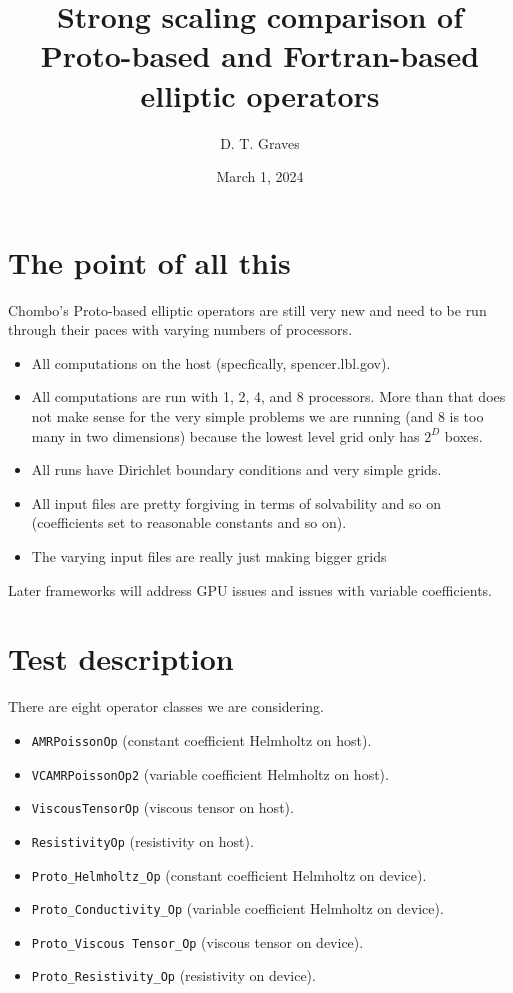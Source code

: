 \documentclass{article}
\begin{document}
\title{Strong scaling comparison of Proto-based and Fortran-based elliptic operators}
\author{D. T. Graves   }
\date{March 1, 2024}

\maketitle

\section{The point of all this}

Chombo's Proto-based elliptic operators are still very new and need to
be run through their paces with varying numbers of processors.
\begin{itemize}
  \item All computations on the host (specfically, spencer.lbl.gov).
  \item All computations are run with 1, 2, 4, and 8 processors.
    More than that does not make sense for the very simple problems we
    are running (and 8 is too many in two dimensions) because the
    lowest level grid only has $2^D$ boxes.
  \item All runs have Dirichlet boundary conditions and very simple
    grids.
  \item All input files are pretty forgiving in terms of solvability
    and so on (coefficients set to reasonable constants and so on).
  \item The varying input files are really just making bigger grids
\end{itemize}
 Later frameworks will address GPU issues and issues with variable coefficients.

 \section{Test description}

 There are eight operator classes we are considering.
 \begin{itemize}
 \item {\tt AMRPoissonOp} (constant coefficient Helmholtz on   host).
 \item {\tt VCAMRPoissonOp2} (variable coefficient Helmholtz on host).
 \item {\tt ViscousTensorOp} (viscous tensor on host).
 \item {\tt ResistivityOp} (resistivity on host).
 \item {\tt Proto\_Helmholtz\_Op} (constant coefficient Helmholtz on device).
 \item {\tt Proto\_Conductivity\_Op} (variable coefficient Helmholtz on device).
 \item {\tt Proto\_Viscous Tensor\_Op} (viscous tensor on device).
 \item {\tt Proto\_Resistivity\_Op} (resistivity on device).
 \end{itemize}
\end{document}
